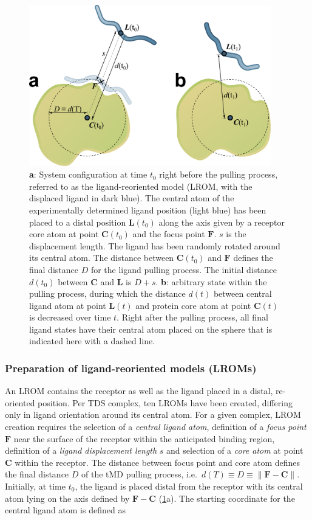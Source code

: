 \begin{figure}
\centering
\includegraphics[height=7cm]{gfx/dmd/scheme_geometry_two_panels_002.pdf}
\caption[]{
\textbf{a}: System configuration at time $t_0$ right before the pulling process,
referred to as the ligand-reoriented model (LROM, with the displaced ligand in
dark blue). The central atom of the experimentally determined ligand position
(light blue) has been placed to a distal position $\bm{L}(t_0)$ along the axis
given by a receptor core atom at point $\bm{C}(t_0)$ and the focus point
$\bm{F}$. $s$ is the displacement length. The ligand has been randomly rotated
around its central atom. The distance between $\bm{C}(t_0)$ and $\bm{F}$ defines
the final distance $D$ for the ligand pulling process. The initial distance
$d(t_0)$ between $\bm{C}$ and $\bm{L}$ is $D+s$.
\textbf{b}: arbitrary state within the pulling process, during which the
distance $d(t)$ between central ligand atom at point $\bm{L}(t)$ and protein
core atom at point $\bm{C}(t)$ is decreased over time $t$. Right after the
pulling process, all final ligand states have their central atom placed on the
sphere that is indicated here with a dashed line.
}
\label{fig:dmd:geometry_scheme}
\end{figure}

\subsubsection{Preparation of ligand-reoriented models (LROMs)}
An LROM contains
the receptor as well as the ligand placed in a distal, re-oriented position. Per
TDS complex, ten LROMs have been created, differing only in ligand orientation
around its central atom. For a given complex, LROM creation requires the
selection of a \textit{central ligand atom}, definition of a \textit{focus
point} $\bm{F}$ near the surface of the receptor within the anticipated binding
region, definition of a \textit{ligand displacement length} $s$ and selection of
a \textit{core atom} at point $\bm{C}$ within the receptor. The distance between
focus point and core atom defines the final distance $D$ of the tMD pulling
process, i.e.\  $d(T) \equiv D \equiv  \lVert \bm{F}-\bm{C} \rVert$. Initially,
at time $t_0$, the ligand is placed distal from the receptor with its central
atom lying on the axis defined by $\bm{F}-\bm{C}$
(\cref{fig:dmd:geometry_scheme}a). The starting coordinate for the central
ligand atom is defined as

